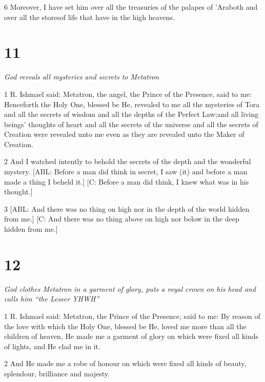 \par 6 Moreover, I have set him over all the treasuries of the palapes of 'Araboth and over all the storesof life that have in the high heavens. 

\chapter{11}

\par \textit{God reveals all mysteries and secrets to Metatron}

\par 1 R. Ishmael said: Metatron, the angel, the Prince of the Presence, said to me: Henceforth the Holy One, blessed be He, revealed to me all the mysteries of Tora and all the secrets of wisdom and all the depths of the Perfect Law;and all living beings' thoughts of heart and all the secrets of the universe and all the secrets of Creation were revealed unto me even as they are revealed unto the Maker of Creation. 

\par 2 And I watched intently to behold the secrets of the depth and the wonderful mystery. [ABL: Before a man did think in secret, I saw (it) and before a man made a thing I beheld it.] [C: Before a man did think, I knew what was in his thought.]

\par 3 [ABL: And there was no thing on high nor in the depth of the world hidden from me.] [C: And there was no thing above on high nor below in the deep hidden from me.]

\chapter{12}

\par \textit{God clothes Metatron in a garment of glory, puts a royal crown on his head and calls him “the Lesser YHWH”}

\par 1 R. Ishmael said: Metatron, the Prince of the Presence, said to me: By reason of the love with which the Holy One, blessed be He, loved me more than all the children of heaven, He made me a garment of glory on which were fixed all kinds of lights, and He clad me in it. 

\par 2 And He made me a robe of honour on which were fixed all kinds of beauty, splendour, brilliance and majesty.

